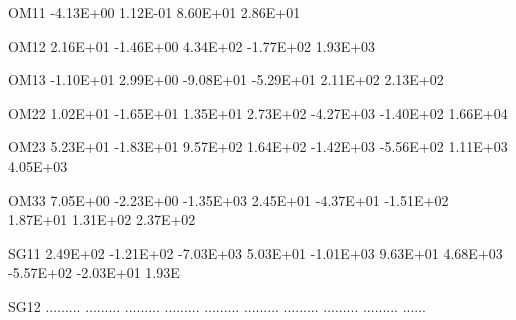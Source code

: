 \documentclass[
  11pt,
  krantz2, a4paper, twoside]{krantz}
\newenvironment{Shaded}{\begin{snugshade}}{\end{snugshade}}
\newcommand{\FloatTok}[1]{\textcolor[rgb]{0.00,0.00,0.81}{#1}}
\newcommand{\NormalTok}[1]{#1}
\theoremstyle{definition}
\theoremstyle{definition}
\theoremstyle{definition}
\theoremstyle{remark}
\begin{document}
\begin{Shaded}
\begin{Highlighting}[]
\NormalTok{OM11   }\FloatTok{{-}4.13E+00}  \FloatTok{1.12E{-}01}  \FloatTok{8.60E+01}  \FloatTok{2.86E+01}                                                         
                                                                                                       
\NormalTok{OM12    }\FloatTok{2.16E+01} \FloatTok{{-}1.46E+00}  \FloatTok{4.34E+02} \FloatTok{{-}1.77E+02}  \FloatTok{1.93E+03}                                               
                                                                                                       
\NormalTok{OM13   }\FloatTok{{-}1.10E+01}  \FloatTok{2.99E+00} \FloatTok{{-}9.08E+01} \FloatTok{{-}5.29E+01}  \FloatTok{2.11E+02}  \FloatTok{2.13E+02}                                     
                                                                                                       
\NormalTok{OM22    }\FloatTok{1.02E+01} \FloatTok{{-}1.65E+01}  \FloatTok{1.35E+01}  \FloatTok{2.73E+02} \FloatTok{{-}4.27E+03} \FloatTok{{-}1.40E+02}  \FloatTok{1.66E+04}                           
                                                                                                       
\NormalTok{OM23    }\FloatTok{5.23E+01} \FloatTok{{-}1.83E+01}  \FloatTok{9.57E+02}  \FloatTok{1.64E+02} \FloatTok{{-}1.42E+03} \FloatTok{{-}5.56E+02}  \FloatTok{1.11E+03}  \FloatTok{4.05E+03}                 
                                                                                                       
\NormalTok{OM33    }\FloatTok{7.05E+00} \FloatTok{{-}2.23E+00} \FloatTok{{-}1.35E+03}  \FloatTok{2.45E+01} \FloatTok{{-}4.37E+01} \FloatTok{{-}1.51E+02}  \FloatTok{1.87E+01}  \FloatTok{1.31E+02}  \FloatTok{2.37E+02}       
                                                                                                       
\NormalTok{SG11    }\FloatTok{2.49E+02} \FloatTok{{-}1.21E+02} \FloatTok{{-}7.03E+03}  \FloatTok{5.03E+01} \FloatTok{{-}1.01E+03}  \FloatTok{9.63E+01}  \FloatTok{4.68E+03} \FloatTok{{-}5.57E+02} \FloatTok{{-}2.03E+01}  \FloatTok{1.93}\NormalTok{E}
                                                                                                       
\NormalTok{SG12   ......... ......... ......... ......... ......... ......... ......... ......... ......... ......}
                                                                                                       

\end{Highlighting}
\end{Shaded}
\end{document}
